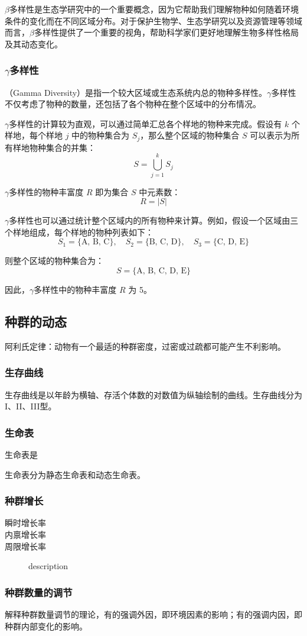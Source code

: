 $\beta$多样性是生态学研究中的一个重要概念，因为它帮助我们理解物种如何随着环境条件的变化而在不同区域分布。对于保护生物学、生态学研究以及资源管理等领域而言，$\beta$多样性提供了一个重要的视角，帮助科学家们更好地理解生物多样性格局及其动态变化。

\subsubsection{$\gamma$多样性}

（Gamma Diversity）是指一个较大区域或生态系统内总的物种多样性。$\gamma$多样性不仅考虑了物种的数量，还包括了各个物种在整个区域中的分布情况。

$\gamma$多样性的计算较为直观，可以通过简单汇总各个样地的物种来完成。假设有 \( k \) 个样地，每个样地 \( j \) 中的物种集合为 \( S_j \)，那么整个区域的物种集合 \( S \) 可以表示为所有样地物种集合的并集：
\[
S = \bigcup_{j=1}^{k} S_j
\]

$\gamma$多样性的物种丰富度 \( R \) 即为集合 \( S \) 中元素数：
\[
R = |S|
\]

$\gamma$多样性也可以通过统计整个区域内的所有物种来计算。例如，假设一个区域由三个样地组成，每个样地的物种列表如下：
\[
S_1 = \{\textrm{A, B, C}\}, \quad S_2 = \{\textrm{B, C, D}\}, \quad S_3 = \{\textrm{C, D, E}\}
\]

则整个区域的物种集合为：
\[
S = \{\textrm{A, B, C, D, E}\}
\]

因此，$\gamma$多样性中的物种丰富度 \( R \) 为 5。

\subsection{种群的动态}

阿利氏定律：动物有一个最适的种群密度，过密或过疏都可能产生不利影响。

\subsubsection{生存曲线}

生存曲线是以年龄为横轴、存活个体数的对数值为纵轴绘制的曲线。生存曲线分为I、II、III型。

\subsubsection{生命表}

生命表是

生命表分为静态生命表和动态生命表。

\subsubsection{种群增长}

\begin{description}
	\item[瞬时增长率] 
	\item[内禀增长率] 
	\item[周限增长率] description
\end{description}

\subsubsection{种群数量的调节}

解释种群数量调节的理论，有的强调外因，即环境因素的影响；有的强调内因，即种群内部变化的影响。

